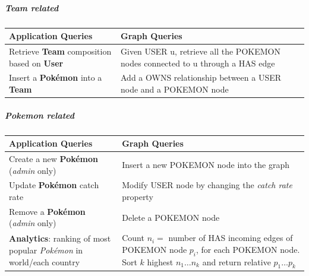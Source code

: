 \endgroup
\subparagraph{Team related}
\begingroup
\setlength{\tabcolsep}{10pt} %
\renewcommand{\arraystretch}{1.5} %
\begin{center}
	\begin{longtable}{|m{}| m{} |} 
		\hline
		\textbf{Application Queries} & \textbf{Graph Queries} \\ [0.5ex] 
		\hline
		Retrieve \textbf{Team} composition based on \textbf{User}		
		& Given USER u, retrieve all the POKEMON nodes connected to u through a HAS edge\\ 
		\hline
		Insert a \textbf{Pokémon} into a \textbf{Team}
		& Add a OWNS relationship between a USER node and a POKEMON node\\
		\hline
	\end{longtable}
\end{center}
\endgroup

\subparagraph{Pokemon related}
\begingroup
\setlength{\tabcolsep}{10pt} 
\renewcommand{\arraystretch}{1.5} 
\begin{center}
	\begin{longtable}{|m{}| m{} |} 
		\hline
		\textbf{Application Queries} & \textbf{Graph Queries} \\ [0.5ex] 
		\hline
		Create a new \textbf{Pokémon} (\textit{admin} only)		
		& Insert a new POKEMON node into the graph\\  
		\hline
		Update \textbf{Pokémon} catch rate
		& Modify USER node by changing the \textit{catch rate} property\\
		\hline
		Remove a \textbf{Pokémon} (\textit{admin} only)
		& Delete a POKEMON node\\
		\hline	
		\textbf{Analytics}: ranking of most popular \textit{Pokémon} in world/each country
		& Count $n_{i} = $ number of HAS incoming edges of POKEMON node $p_{i}$, for each POKEMON node.
		Sort $k$ highest $n_{1}…n_{k}$ and return relative $p_{1}…p_{k}$\\
		\hline
	\end{longtable}
\end{center}
\endgroup

